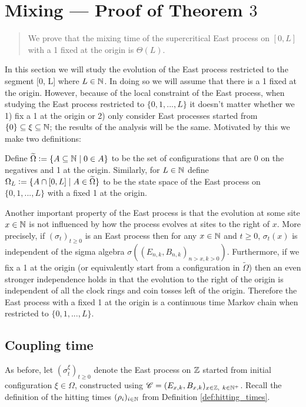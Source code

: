 \section{Mixing --- Proof of Theorem $3$}
\begin{quote}
{\small We prove that the mixing time of the supercritical East process on $[0, L]$ with a 1 fixed at the origin is $\Theta(L)$. }
\end{quote}

In this section we will study the evolution of the East process restricted to the segment [0, L] where $L \in \mathbb{N}$. In doing so we will assume that there is a 1 fixed at the origin. However, because of the local constraint of the East process, when studying the East process restricted to $\{0, 1, ..., L\}$ it doesn't matter whether we 1) fix a 1 at the origin or 2) only consider East processes started from $\{0\} \subseteq \xi \subseteq \mathbb{N}$; the results of the analysis will be the same. Motivated by this we make two definitions:

\begin{definition}
Define $\widetilde{\Omega} \vcentcolon= \{A \subseteq \mathbb{N} \mid 0 \in A \}$ to be the set of configurations that are 0 on the negatives and 1 at the origin. Similarly, for $L \in \mathbb{N}$ define $\Omega_L \vcentcolon= \{ A \cap [0, L] \mid A \in \widetilde{\Omega} \}$ to be the state space of the East process on $\{0, 1, ..., L\}$ with a fixed 1 at the origin. 
\end{definition}

Another important property of the East process is that the evolution at some site $x \in \mathbb{N}$ is not influenced by how the process evolves at sites to the right of $x$. More precisely, if $(\sigma_t)_{t \geq 0}$ is an East process then for any $x \in \mathbb{N}$ and $t \geq 0$, $\sigma_t (x)$ is independent of the sigma algebra $\sigma \left( (E_{n,k}, B_{n,k})_{n > x, k > 0}\right)$. Furthermore, if we fix a 1 at the origin (or equivalently start from a configuration in $\widetilde{\Omega}$) then an even stronger independence holds in that the evolution to the right of the origin is independent of all the clock rings and coin tosses left of the origin. Therefore the East process with a fixed 1 at the origin is a continuous time Markov chain when restricted to $\{0, 1, ..., L\}$. 

\subsection{Coupling time}
As before, let $(\sigma^\xi_t)_{t \geq 0}$ denote the East process on $\mathbb{Z}$ started from initial configuration $\xi \in \Omega$, constructed using $\mathscr{C} = (E_{x,k}, B_{x,k})_{x \in \mathbb{Z},\ k \in \mathbb{N}^+}$. Recall the definition of the hitting times $(\rho_i)_{i \in \mathbb{N}}$ from Definition \ref{def:hitting_times}.  


